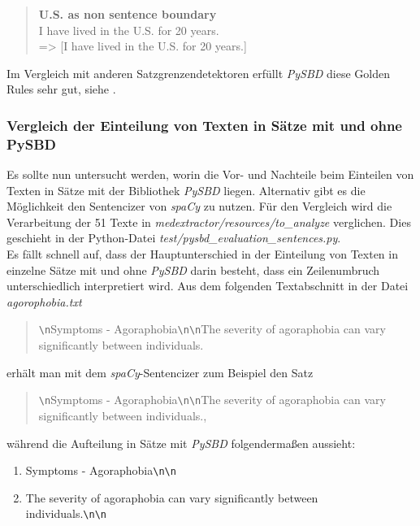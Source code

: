 \begin{quotation}
	\textbf{\glqq U.S. as non sentence boundary\grqq}\\
	I have lived in the U.S. for 20 years. \\
	=> [\glqq I have lived in the U.S. for 20 years.\grqq]\\
\end{quotation}

Im Vergleich mit anderen Satzgrenzendetektoren erfüllt \emph{PySBD} diese Golden Rules sehr gut, siehe \cite{sadvilkar_pysbd_2020}.

\subsubsection{Vergleich der Einteilung von Texten in Sätze mit und ohne PySBD}
Es sollte nun untersucht werden, worin die Vor- und Nachteile beim Einteilen von Texten in Sätze mit der Bibliothek \emph{PySBD} liegen. 
Alternativ gibt es die Möglichkeit den Sentencizer von \emph{spaCy }zu nutzen. Für den Vergleich wird die Verarbeitung der 51 Texte in 
\emph{medextractor/resources/to\_analyze} verglichen. Dies geschieht in der Python-Datei \emph{test/pysbd\_evaluation\_sentences.py}.\\

Es fällt schnell auf, dass der Hauptunterschied in der Einteilung von Texten in einzelne Sätze mit und ohne \emph{PySBD} darin besteht, 
dass ein Zeilenumbruch unterschiedlich interpretiert wird.
Aus dem folgenden Textabschnitt in der Datei \emph{agorophobia.txt}\\

\begin{quotation}
	\glqq \verb!\n!Symptoms - Agoraphobia\verb!\n!\verb!\n!The severity of agoraphobia can vary significantly between individuals.\grqq
\end{quotation}

erhält man mit dem \emph{spaCy}-Sentencizer zum Beispiel den Satz

\begin{quotation}
	\glqq \verb!\n!Symptoms - Agoraphobia\verb!\n!\verb!\n!The severity of agoraphobia can vary significantly between individuals.\grqq,
\end{quotation}

während die Aufteilung in Sätze mit \emph{PySBD} folgendermaßen aussieht:

\begin{enumerate}
	\item \glqq Symptoms - Agoraphobia\verb!\n!\verb!\n!\grqq
	\item \glqq The severity of agoraphobia can vary significantly between \\individuals.\verb!\n!\verb!\n!\grqq
\end{enumerate}

